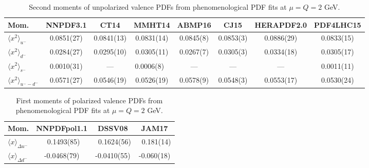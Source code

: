 \begin{table}[!b]
\centering
\small
\begin{tabular}{lccccccc}
\toprule
Mom. & NNPDF3.1 & CT14 & MMHT14 & ABMP16 & CJ15 & HERAPDF2.0 & PDF4LHC15 \\
\midrule
$\langle x^2\rangle_{u^-}$ 
& 0.0851(27) & 0.0841(13) & 0.0831(14)    
& 0.0845(8) & 0.0853(3) & 0.0886(29) & 0.0833(15) \\
$\langle x^2\rangle_{d^-}$
& 0.0284(27) & 0.0295(10) & 0.0305(11)    
& 0.0267(7) & 0.0305(3) & 0.0334(18) & 0.0305(17) \\ 
$\langle x^2\rangle_{s^-}$
& 0.0010(31) & ---        & 0.0006(8)\ \, 
& ---       & ---       & ---        & 0.0011(11) \\
$\langle x^2\rangle_{u^--d^-}$
& 0.0571(27) & 0.0546(19) & 0.0526(19)    
& 0.0578(9) & 0.0548(3) & 0.0553(17) & 0.0530(24) \\
\bottomrule
\end{tabular}
\caption{\small Second moments of unpolarized valence PDFs from 
phenomenological PDF fits at $\mu=Q=2$ GeV.}
\label{tab:unpHmoms}
\end{table}

\begin{table}[!b]
\centering
\footnotesize
\begin{tabular}{lccc}
\toprule
Mom. & NNPDFpol1.1 & DSSV08 & JAM17\\
\midrule
$\langle x\rangle_{\Delta u^-}$ 
& \ 0.1493(85) & \ 0.1624(56) & \ 0.181(14)\\
$\langle x\rangle_{\Delta d^-}$ 
&  -0.0468(79) &  -0.0410(55) &  -0.060(18)\\
\bottomrule
\end{tabular}
\caption{\small First moments of polarized valence PDFs from phenomenological 
PDF fits at $\mu=Q=2$ GeV.}
\label{tab:polHmoms}
\end{table}


